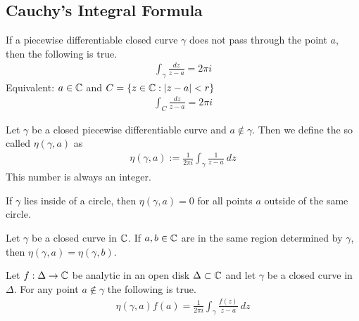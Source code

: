 \subsection{Cauchy's Integral Formula}

\begin{theorem}
    If a piecewise differentiable closed curve $\gamma$ does not pass through the point
    $a$, then the following is true.
    \begin{align*}
        \int_\gamma \frac{dz}{z-a} = 2 \pi i
    \end{align*}
    Equivalent: $a \in \mathbb{C}$ and $C = \left\{ z \in \mathbb{C} : \left\vert z-a \right\vert < r \right\}$
    \begin{align*}
        \int_C \frac{dz}{z-a} = 2 \pi i
    \end{align*}
\end{theorem}

\begin{definition}
    Let $\gamma$ be a closed piecewise differentiable curve and $a \notin \gamma$.
    Then we define the so called  $\eta(\gamma,a)$ as
    \begin{align*}
        \eta(\gamma,a) := \frac{1}{2 \pi i} \int_\gamma \frac{1}{z-a} \ dz
    \end{align*}
    This number is always an integer.
\end{definition}

\begin{proposition}
    If $\gamma$ lies inside of a circle, then $\eta(\gamma,a) = 0$ for all points
    $a$ outside of the same circle.
\end{proposition}

\begin{theorem}
    Let $\gamma$ be a closed curve in $\mathbb{C}$. If $a,b \in \mathbb{C}$ are in the same region
    determined by $\gamma$, then $\eta(\gamma,a) = \eta(\gamma,b)$.
\end{theorem}

\begin{theorem}
    Let $f: \Delta \rightarrow \mathbb{C}$ be analytic in an open disk $\Delta \subset \mathbb{C}$
    and let $\gamma$ be a closed curve in $\Delta$. For any point $a \notin \gamma$
    the following is true.
    \begin{align*}
        \eta(\gamma,a) f(a) = \frac{1}{2 \pi i} \int_\gamma \frac{f(z)}{z-a} \ dz
    \end{align*}
\end{theorem}

